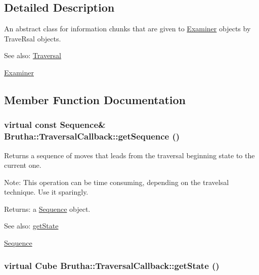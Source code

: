 \subsection{Detailed Description}
An abstract class for information chunks that are given to \hyperlink{classBrutha_1_1Examiner}{Examiner} objects by TraveRsal objects. 

\begin{Desc}
\item[See also:]\hyperlink{classBrutha_1_1Traversal}{Traversal} 

\hyperlink{classBrutha_1_1Examiner}{Examiner} \end{Desc}


\subsection{Member Function Documentation}
\hypertarget{classBrutha_1_1TraversalCallback_8946d090513db014bbf7b542dc70866c}{
\subsubsection[{getSequence}]{\setlength{\rightskip}{0pt plus 5cm}virtual const {\bf Sequence}\& Brutha::TraversalCallback::getSequence ()}}
\label{classBrutha_1_1TraversalCallback_8946d090513db014bbf7b542dc70866c}


Returns a sequence of moves that leads from the traversal beginning state to the current one. 

\begin{Desc}
\item[Note:]This operation can be time consuming, depending on the travelsal technique. Use it sparingly.\end{Desc}
\begin{Desc}
\item[Returns:]a \hyperlink{classBrutha_1_1Sequence}{Sequence} object.\end{Desc}
\begin{Desc}
\item[See also:]\hyperlink{classBrutha_1_1TraversalCallback_c037795e35fc6b1a2c65cb1e0e976356}{getState} 

\hyperlink{classBrutha_1_1Sequence}{Sequence} \end{Desc}
\hypertarget{classBrutha_1_1TraversalCallback_c037795e35fc6b1a2c65cb1e0e976356}{
\subsubsection[{getState}]{\setlength{\rightskip}{0pt plus 5cm}virtual Cube Brutha::TraversalCallback::getState ()}}
\label{classBrutha_1_1TraversalCallback_c037795e35fc6b1a2c65cb1e0e976356}


